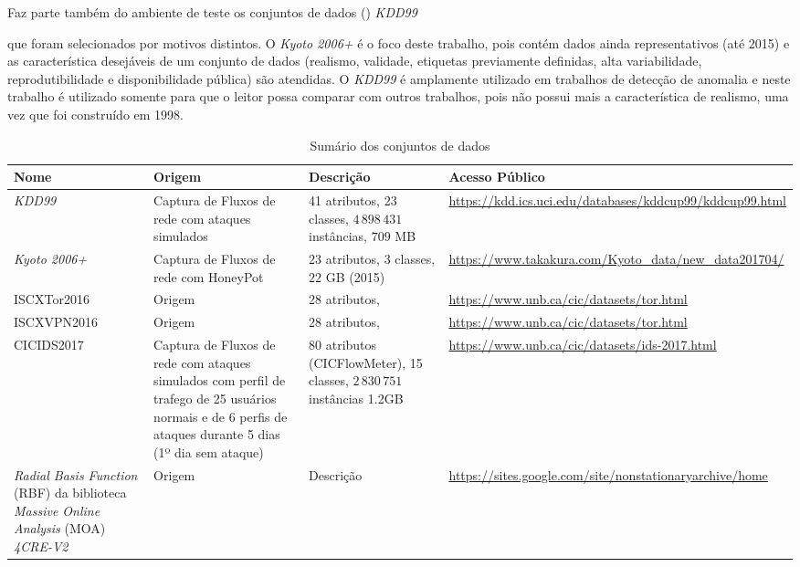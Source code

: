 Faz parte também do ambiente de teste os conjuntos de dados (\datasets)
\emph{KDD99}

que foram selecionados por motivos distintos.
O \dataset \emph{Kyoto 2006+} é o foco deste trabalho, pois contém dados ainda
representativos (até 2015) e as característica desejáveis de um conjunto de dados
(realismo, validade, etiquetas previamente definidas, alta variabilidade,
reprodutibilidade e disponibilidade pública) são atendidas.
O \dataset \emph{KDD99} é amplamente utilizado em trabalhos de detecção de
anomalia e neste trabalho é utilizado somente para que o leitor possa comparar com outros
trabalhos, pois não possui mais a característica de realismo, uma vez que foi
construído em 1998.

\begin{table}[ht]
  \caption{Sumário dos conjuntos de dados}
  \centering
  \begin{scriptsize}
  \begin{tabularx}{\linewidth}{X|X|X|X}
    Nome &
      Origem &
      Descrição &
      Acesso Público \\
    \hline
    \hline
    \emph{KDD99} &
      Captura de Fluxos de rede com ataques simulados &
      41 atributos, 23 classes, $4\,898\,431$ instâncias, $709$ MB &
      \url{https://kdd.ics.uci.edu/databases/kddcup99/kddcup99.html} \\
    \hline
    \emph{Kyoto 2006+} \cite{Song2011kyoto}&
      Captura de Fluxos de rede com HoneyPot &
      23 atributos, 3 classes, $22$ GB (2015) &
      \url{https://www.takakura.com/Kyoto_data/new_data201704/} \\
    \hline
    ISCXTor2016 \cite{Draper-Gil2016} &
      Origem &
      28 atributos,  &
      \url{https://www.unb.ca/cic/datasets/tor.html} \\
    \hline
    ISCXVPN2016 \cite{Lashkari2017} &
      Origem &
      28 atributos,  &
      \url{https://www.unb.ca/cic/datasets/tor.html} \\
    \hline
    CICIDS2017 &
      Captura de Fluxos de rede com ataques simulados com perfil de trafego de 25
      usuários normais e de 6 perfis de ataques durante 5 dias (1º dia sem ataque) &
      80 atributos (CICFlowMeter), 15 classes, $2\,830\,751$ instâncias
      1.2GB
      &
      \url{https://www.unb.ca/cic/datasets/ids-2017.html} \\
    \hline
    \emph{Radial Basis Function} (RBF) da biblioteca \emph{Massive Online Analysis} (MOA)
    \emph{4CRE-V2} &
      Origem &
      Descrição &
      \url{https://sites.google.com/site/nonstationaryarchive/home} \\
    \hline
  \end{tabularx}
  \label{tab:summary-dataset}
  \end{scriptsize}
\end{table}

